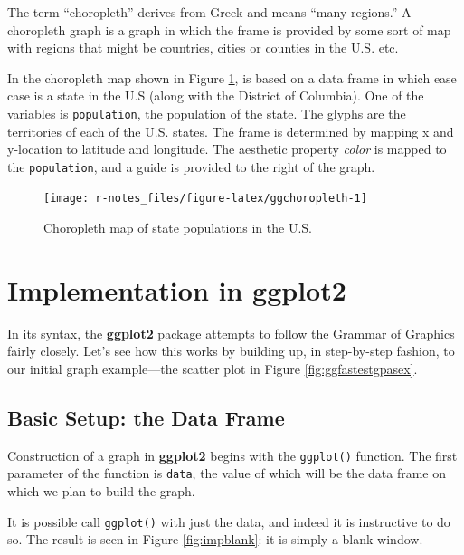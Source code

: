 \documentclass[]{book}
\theoremstyle{definition}
\theoremstyle{definition}
\theoremstyle{definition}
\theoremstyle{remark}
\begin{document}
{The term ``choropleth'' derives from Greek and means ``many regions.'' A
choropleth graph is a graph in which the frame is provided by some sort
of map with regions that might be countries, cities or counties in the
U.S. etc.

In the choropleth map shown in Figure \ref{fig:ggchoropleth}, is based
on a data frame in which ease case is a state in the U.S (along with the
District of Columbia). One of the variables is \texttt{population}, the
population of the state. The glyphs are the territories of each of the
U.S. states. The frame is determined by mapping x and y-location to
latitude and longitude. The aesthetic property \emph{color} is mapped to
the \texttt{population}, and a guide is provided to the right of the
graph.

\begin{figure}

{\centering \texttt{[image: r-notes\_files/figure-latex/ggchoropleth-1]} 

}

\caption{Choropleth map of state populations in the U.S.}\label{fig:ggchoropleth}
\end{figure}

\section{\texorpdfstring{Implementation in
\textbf{ggplot2}}{Implementation in ggplot2}}\label{implementation-in-ggplot2}

In its syntax, the \textbf{ggplot2} package attempts to follow the
Grammar of Graphics fairly closely. Let's see how this works by building
up, in step-by-step fashion, to our initial graph example---the scatter
plot in Figure \ref{fig:ggfastestgpasex}.

\subsection{Basic Setup: the Data
Frame}\label{basic-setup-the-data-frame}

Construction of a graph in \textbf{ggplot2} begins with the
\texttt{ggplot()} function. The first parameter of the function is
\texttt{data}, the value of which will be the data frame on which we
plan to build the graph.

It is possible call \texttt{ggplot()} with just the data, and indeed it
is instructive to do so. The result is seen in Figure
\ref{fig:impblank}: it is simply a blank window.

}
\end{document}
